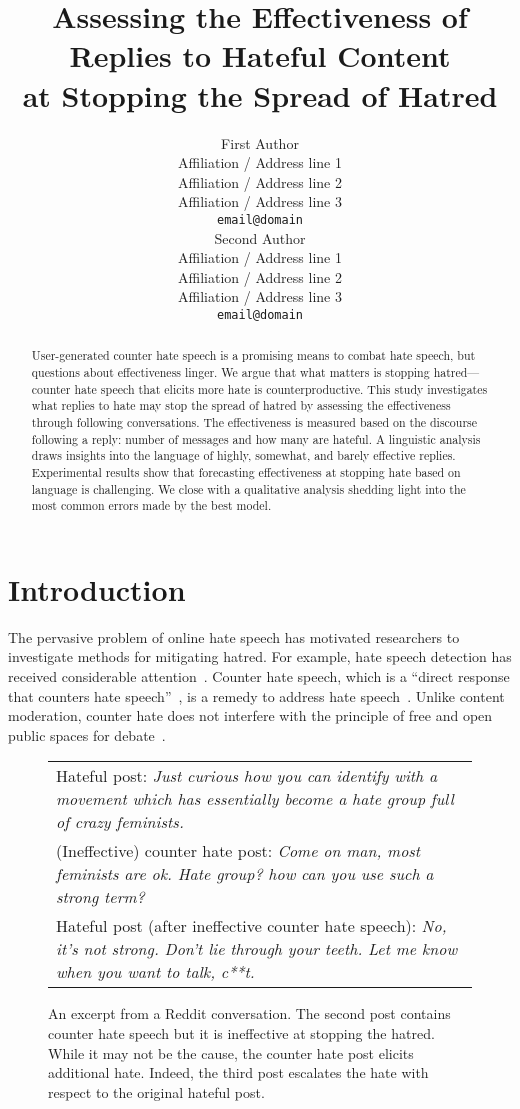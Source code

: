 \documentclass[11pt]{article}
\title{Assessing the Effectiveness of Replies to Hateful Content\\at Stopping the Spread of Hatred}
\author{First Author \\
  Affiliation / Address line 1 \\
  Affiliation / Address line 2 \\
  Affiliation / Address line 3 \\
  \texttt{email@domain} \\\And
  Second Author \\
  Affiliation / Address line 1 \\
  Affiliation / Address line 2 \\
  Affiliation / Address line 3 \\
  \texttt{email@domain} \\}
\begin{document}
\maketitle
\begin{abstract}
User-generated counter hate speech is a promising means to combat hate speech,
but questions about effectiveness linger.
We argue that what matters is stopping hatred---counter hate speech that elicits more hate is counterproductive.
This study investigates what replies to hate may stop the spread of hatred by assessing the effectiveness through following conversations. 
The effectiveness is measured based on the discourse following a reply: number of messages and how many are hateful.
A linguistic analysis draws insights into 
the language of highly, somewhat, and barely effective replies.
Experimental results show that forecasting effectiveness at stopping hate based on language is challenging.
We close with a qualitative analysis shedding light into the most common errors made by the best model.
\end{abstract}

\section{Introduction}
The pervasive problem of online hate speech has motivated
researchers to investigate methods for mitigating hatred.
For example, hate speech detection has received considerable attention~\cite{schmidt-wiegand-2017-survey,10.1145/3232676}. 
Counter hate speech, which is a ``direct response that counters hate speech''~\cite{DBLP:conf/icwsm/MathewSTRSMG019},
is a remedy to address hate speech~\cite{richards2000counterspeech}. 
Unlike content moderation,
counter hate does not interfere with the principle of free and open public spaces for debate~\cite{DBLP:conf/icwsm/MathewSTRSMG019,schieb2016governing,chung-etal-2019-conan}.

\begin{figure}
	\small
	\centering
	\begin{tabular}{@{}p{\columnwidth}@{}}
		\toprule
		Hateful post:
		\emph{Just curious how you can identify with a movement which has essentially become a hate group full of crazy feminists.}  \\ \addlinespace
		(Ineffective) counter hate post:
		\emph{Come on man, most feminists are ok. Hate group? how can you use such a strong term?}  \\ \addlinespace
		Hateful post (after ineffective counter hate speech):
		\emph{No, it’s not strong. Don’t lie through your teeth. Let me know when you want to talk, c**t.} \\ 
		\bottomrule
	\end{tabular}
	\caption{
		An excerpt from a Reddit conversation.
		The second post contains counter hate speech but it is ineffective at stopping the hatred.
		While it may not be the cause, the counter hate post elicits additional hate.
		Indeed, the third post escalates the hate with respect to the original hateful post.
	}
	\label{f:problem-example}
\end{figure}
\end{document}
